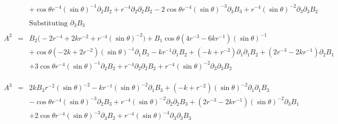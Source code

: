 \documentclass[10pt,letterpaper]{article}
\numberwithin{equation}{section}
\begin{document}
\begin{eqnarray}
&& + \cos\theta r^{-4} (\sin\theta)^{-1} \partial_{2}B_{2} + r^{-4} \partial_{2}\partial_{2}B_{2} - 2 \cos\theta r^{-4} (\sin\theta)^{-3} \partial_{3}B_{3} + r^{-4} (\sin\theta)^{-2} \partial_{3}\partial_{3}B_{2}
\\ \nonumber\\
&&\text{Substituting $\partial_3 B_3$}
\\ \nonumber\\
A^{2}&=& B_{2} \bigl(-2 r^{-4} + 2 k r^{-2} + r^{-4} (\sin\theta)^{-2}\bigr) + B_{1} \cos\theta (4 r^{-3} - 6 k r^{-1}) (\sin\theta)^{-1} \nonumber \\ 
&& + \cos\theta (-2 k + 2 r^{-2}) (\sin\theta)^{-1} \partial_{1}B_{1} -  k r^{-1} \partial_{1}B_{2} + (- k + r^{-2}) \partial_{1}\partial_{1}B_{2} + (2 r^{-3} - 2 k r^{-1}) \partial_{2}B_{1} \nonumber \\ 
&& + 3 \cos\theta r^{-4} (\sin\theta)^{-1} \partial_{2}B_{2} + r^{-4} \partial_{2}\partial_{2}B_{2} + r^{-4} (\sin\theta)^{-2} \partial_{3}\partial_{3}B_{2}
\\ \nonumber\\
\\ \nonumber\\
A^{3}&=& 2 k B_{3} r^{-2} (\sin\theta)^{-2} -  k r^{-1} (\sin\theta)^{-2} \partial_{1}B_{3} + (- k + r^{-2}) (\sin\theta)^{-2} \partial_{1}\partial_{1}B_{3} \nonumber \\ 
&& -  \cos\theta r^{-4} (\sin\theta)^{-3} \partial_{2}B_{3} + r^{-4} (\sin\theta)^{-2} \partial_{2}\partial_{2}B_{3} + (2 r^{-3} - 2 k r^{-1}) (\sin\theta)^{-2} \partial_{3}B_{1} \nonumber \\ 
&& + 2 \cos\theta r^{-4} (\sin\theta)^{-3} \partial_{3}B_{2} + r^{-4} (\sin\theta)^{-4} \partial_{3}\partial_{3}B_{3}
\end{eqnarray}

\end{document}
